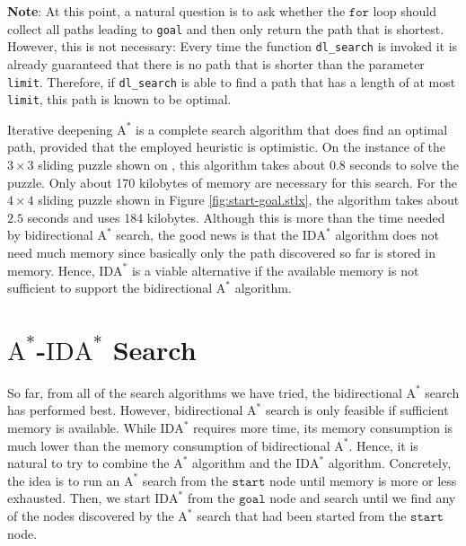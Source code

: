 \begin{enumerate}
      \textbf{Note}: At this point, a natural question is to ask whether the $\texttt{for}$ loop should collect
      all paths leading to \texttt{goal} and then only return the path that is shortest.  However, this is
      not necessary:  Every time the function \texttt{dl\_search} is invoked it is already guaranteed that there
      is no path that is shorter than the parameter \texttt{limit}.  Therefore, if \texttt{dl\_search} is able
      to find a path that has a length of at most \texttt{limit}, this path is known to be optimal.
\end{enumerate}
Iterative deepening $\mathrm{A}^*$ is a complete search algorithm that does find an optimal path, provided that the employed heuristic
is optimistic.  On the instance of the $3 \times 3$ sliding puzzle shown on , this
algorithm takes about $0.8$ seconds to solve the puzzle.  Only about 170 kilobytes of memory are necessary for
this search.  For the $4 \times 4$ sliding puzzle shown in Figure
\ref{fig:start-goal.stlx}, the algorithm 
takes about $2.5$ seconds and uses 184 kilobytes.  Although this is more than the time needed by bidirectional $\mathrm{A}^*$ search,
the good news is that the $\mathrm{IDA}^*$ algorithm does not need much memory since basically only the path
discovered so far is stored in memory.  Hence, $\mathrm{IDA}^*$ is a viable alternative if the available memory
is not sufficient to support the bidirectional $\mathrm{A}^*$ algorithm.

\section{$\mathrm{A}^*$-$\mathrm{IDA}^*$ Search}
So far, from all of the search algorithms we have tried, the bidirectional $\mathrm{A}^*$ search has performed best.  However,
bidirectional $\mathrm{A}^*$ search is only feasible if sufficient memory is available.   While
$\mathrm{IDA}^*$ requires more time, its memory consumption is much lower than the memory consumption of
bidirectional $\mathrm{A}^*$.  Hence, it is natural to try to combine the $\mathrm{A}^*$ algorithm and the
$\mathrm{IDA}^*$ algorithm.  Concretely, the
idea is to run an $\mathrm{A}^*$ search from the $\texttt{start}$ node until memory is more or less
exhausted.  Then, we start $\mathrm{IDA}^*$ from the $\texttt{goal}$ node and search until we find any of the
nodes discovered by the $\mathrm{A}^*$ search that had been started from the $\texttt{start}$ node.


